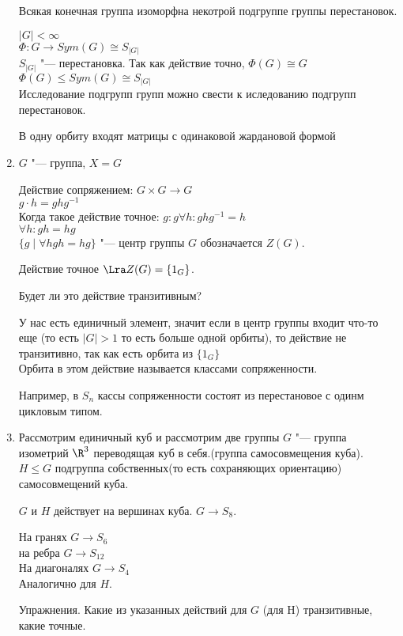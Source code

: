 \begin{exmp}
\begin{enumerate}
\begin{conseq}
Всякая конечная группа изоморфна некотрой подгруппе группы перестановок.

$|G| < \infty$ \\
$\Phi \colon G \to Sym(G)\cong S_{|G|}$\\
$S_{|G|}$ "--- перестановка.
Так как действие точно, $\Phi(G) \cong G$\\
$\Phi(G) \le Sym(G) \cong S_{|G|}$\\

Исследование подгрупп групп можно свести к иследованию подгрупп перестановок.
\begin{Rem}
  В одну орбиту входят матрицы с одинаковой жардановой формой
\end{Rem}
\end{conseq}
\item
$G$ "--- группа, $X = G$

Действие сопряжением:
$G \times G \to G$\\
$g \cdot h = ghg^{-1}$\\
Когда такое действие точное:
$g \colon g \forall h \colon ghg^{-1} = h$\\
$\forall h \colon gh = hg$ \\
$\{g \mid \forall h gh = hg\} $ "--- центр группы $G$ обозначается $Z(G)$.

Действие точное $\Lra Z(G) = \{1_{G}\}$.

Будет ли это действие транзитивным?

У нас есть единичный элемент, значит если в центр группы входит что-то еще (то есть $|G| > 1$ то есть больше одной орбиты), то 
действие не транзитивно, так  как есть орбита из $\{1_G\}$\\

Орбита в этом действие называется классами сопряженности.

Например, в $S_n$ кассы сопряженности состоят из перестановое с одинм цикловым типом.
\item
Рассмотрим единичный куб и рассмотрим две группы 
$G$ "--- группа изометрий $\R^3$ переводящая куб в себя.(группа самосовмещения куба).
$H \le G$ подгруппа собственных(то есть сохраняющих ориентацию) самосовмещений куба.

$G$ и $H$ действует на вершинах куба.
$G \to S_8$.

На гранях $G \to S_6$\\
на ребра $G \to S_{12}$\\
На диагоналях $G \to S_4$\\

Аналогично для $H$.


Упражнения. Какие из указанных действий для $G$ (для H) транзитивные, 
какие точные.
\end{enumerate}
\end{exmp}
                       
